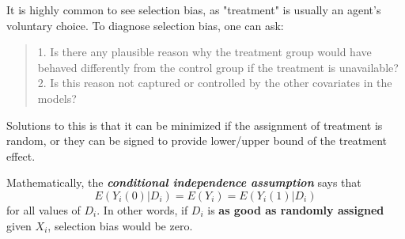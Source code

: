 It is highly common to see selection bias, as "treatment" is usually an agent's voluntary choice. To diagnose selection bias, one can ask:
\begin{quote}
    1. Is there any plausible reason why the treatment group would have behaved differently from the control group if the treatment is unavailable? \\
    2. Is this reason not captured or controlled by the other covariates in the models?
\end{quote}

Solutions to this is that it can be minimized if the assignment of treatment is random, or they can be signed to provide lower/upper bound of the treatment effect.

Mathematically, the \textbf{\textit{conditional independence assumption}} says that
$$E(Y_i(0)|D_i) = E(Y_i) = E(Y_i(1) | D_i)$$
for all values of $D_i$. In other words, if $D_i$ is \textbf{as good as randomly assigned} given $X_i$, selection bias would be zero.